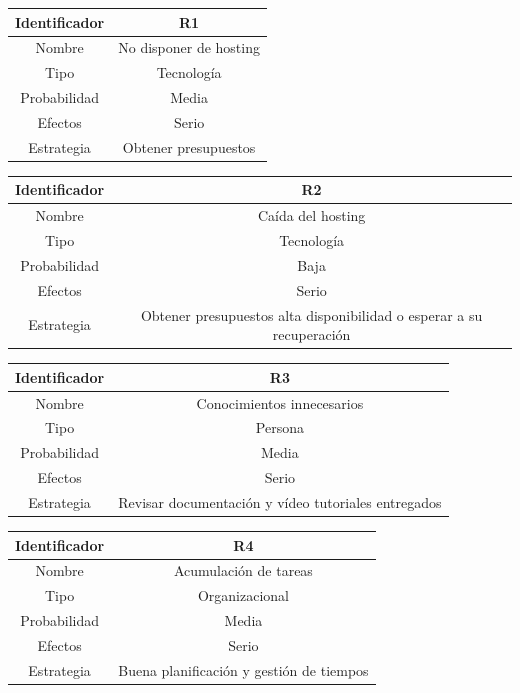 \vspace{1em}
\par
\begin{tabular}{||c|c||} 
\hline
Identificador & R1 \\ [0.5ex] 
\hline\hline
Nombre & No disponer de hosting \\ 
\hline
Tipo & Tecnología \\
\hline
Probabilidad & Media \\
\hline
Efectos & Serio \\
\hline
Estrategia & Obtener presupuestos \\ [1ex] 
\hline
\end{tabular}

\vspace{1em}
\par
\begin{tabular}{||c|c||} 
\hline
Identificador & R2 \\ [0.5ex] 
\hline\hline
Nombre & Caída del hosting \\ 
\hline
Tipo & Tecnología \\
\hline
Probabilidad & Baja \\
\hline
Efectos & Serio \\
\hline
Estrategia & Obtener presupuestos alta disponibilidad o esperar a su recuperación \\ [1ex] 
\hline
\end{tabular}

\vspace{1em}
\par
\begin{tabular}{||c|c||} 
\hline
Identificador & R3 \\ [0.5ex] 
\hline\hline
Nombre & Conocimientos innecesarios \\ 
\hline
Tipo & Persona \\
\hline
Probabilidad & Media \\
\hline
Efectos & Serio \\
\hline
Estrategia & Revisar documentación y vídeo tutoriales entregados \\ [1ex] 
\hline
\end{tabular}

\vspace{1em}
\par
\begin{tabular}{||c|c||} 
\hline
Identificador & R4 \\ [0.5ex] 
\hline\hline
Nombre & Acumulación de tareas \\ 
\hline
Tipo & Organizacional \\
\hline
Probabilidad & Media \\
\hline
Efectos & Serio \\
\hline
Estrategia & Buena planificación y gestión de tiempos \\ [1ex] 
\hline
\end{tabular}


